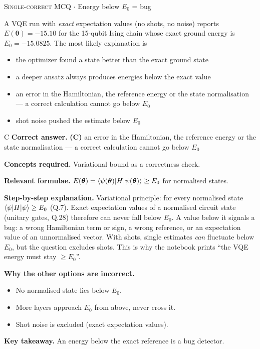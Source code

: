 \documentclass[11pt,a4paper]{article}
\newcommand{\optlabel}[1]{\textbf{(#1)}}
\newcommand{\correctlabel}[1]{\textcolor{okgreen}{\textbf{(#1)}\,\ding{51}}}
\newenvironment{qitem}[1]{\begin{list}{}{\setlength{\leftmargin}{3.3em}\setlength{\labelwidth}{3.1em}%
  \setlength{\labelsep}{0.2em}\setlength{\topsep}{3pt}\setlength{\parsep}{3pt}}\item[\textbf{Q.#1}\hfill]}{\end{list}}
\newcommand{\qsep}{\par\vspace{2pt}{\color{black!15}\hrule}\vspace{4pt}}
\newcommand{\qmeta}[2]{{\footnotesize\color{black!60}\textsc{#1} \;$\cdot$\; #2}\par}
\begin{document}
\begin{qitem}{41}
\qmeta{Single-correct MCQ}{Energy below $E_0$ = bug}
A VQE run with \emph{exact} expectation values (no shots, no noise) reports $E(\boldsymbol\theta) = -15.10$ for the 15-qubit Ising chain whose exact ground
energy is $E_0 = -15.0825$. The most likely explanation is
\begin{itemize}[leftmargin=2.6em, labelsep=0.4em, itemsep=2pt, topsep=3pt]
\item[\optlabel{A}] the optimizer found a state better than the exact ground state
\item[\optlabel{B}] a deeper ansatz always produces energies below the exact value
\item[\correctlabel{C}] an error in the Hamiltonian, the reference energy or the state normalisation --- a correct calculation cannot go below $E_0$
\item[\optlabel{D}] shot noise pushed the estimate below $E_0$
\end{itemize}
\end{qitem}
\begin{solbox}{C}
\textbf{\color{brand}Correct answer.} \textcolor{okgreen}{\textbf{(C)}} an error in the Hamiltonian, the reference energy or the state normalisation --- a correct calculation cannot go below $E_0$

\textbf{\color{brand}Concepts required.} Variational bound as a correctness check.

\textbf{\color{brand}Relevant formulae.} $E(\boldsymbol\theta) = \braket{\psi(\boldsymbol\theta)|H|\psi(\boldsymbol\theta)} \ge E_0$ for normalised states.

\textbf{\color{brand}Step-by-step explanation.} Variational principle: for every normalised state $\braket{\psi|H|\psi} \ge E_0$ (Q.7). Exact expectation values of a normalised circuit state
(unitary gates, Q.28) therefore can never fall below $E_0$. A value below it signals a bug: a wrong Hamiltonian term or sign, a wrong
reference, or an expectation value of an unnormalised vector. With shots, single estimates \emph{can} fluctuate below $E_0$, but the
question excludes shots. This is why the notebook prints ``the VQE energy must stay $\ge E_0$''.

\textbf{\color{brand}Why the other options are incorrect.}
\begin{itemize}[leftmargin=2.4em, itemsep=1pt, topsep=2pt]
\item[\textbf{(A)}] No normalised state lies below $E_0$.
\item[\textbf{(B)}] More layers approach $E_0$ from above, never cross it.
\item[\textbf{(D)}] Shot noise is excluded (exact expectation values).
\end{itemize}
\textbf{\color{brand}Key takeaway.} An energy below the exact reference is a bug detector.
\end{solbox}
\qsep
\end{document}
